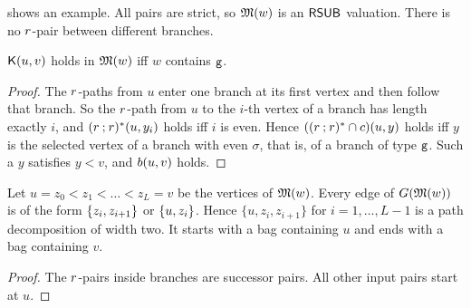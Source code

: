  shows an example.
All pairs are strict, so $\mathfrak{M}(w)$ is an $\mathsf{RSUB}$ valuation.
There is no $r$-pair between different branches.

\begin{lemma}[Signal]\label{lemma: signal}
  $\mathsf{K}(u, v)$ holds in $\mathfrak{M}(w)$ iff $w$ contains $\mathtt{g}$.
\end{lemma}
\begin{proof}
  The $r$-paths from $u$ enter one branch at its first vertex and then follow that branch.
  So the $r$-path from $u$ to the $i$-th vertex of a branch has length exactly $i$, and $(r \mathbin{;} r)^{*}(u, y_i)$ holds iff $i$ is even.
  Hence $((r \mathbin{;} r)^{*} \cap c)(u, y)$ holds iff $y$ is the selected vertex of a branch with even $\sigma$, that is, of a branch of type $\mathtt{g}$.
  Such a $y$ satisfies $y < v$, and $b(u, v)$ holds.
\end{proof}

\begin{lemma}[Shape]\label{lemma: module shape}
  Let $u = z_0 < z_1 < \dots < z_L = v$ be the vertices of $\mathfrak{M}(w)$.
  Every edge of $G(\mathfrak{M}(w))$ is of the form $\{z_i, z_{i+1}\}$ or $\{u, z_i\}$.
  Hence $\{u, z_i, z_{i+1}\}$ for $i = 1, \dots, L-1$ is a path decomposition of width two.
  It starts with a bag containing $u$ and ends with a bag containing $v$.
\end{lemma}
\begin{proof}
  The $r$-pairs inside branches are successor pairs.
  All other input pairs start at $u$.
\end{proof}
